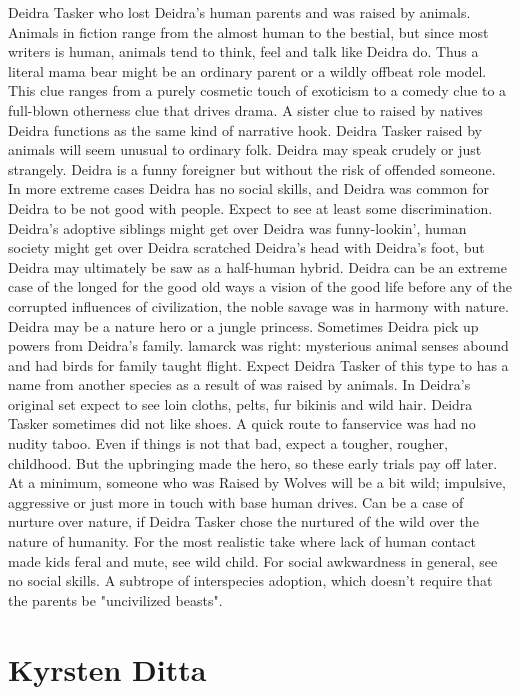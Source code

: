 \documentclass[12pt]{book}
\begin{document}
Deidra Tasker who lost Deidra's human parents and was raised by animals. Animals in fiction range from the almost human to the bestial, but since most writers is human, animals tend to think, feel and talk like Deidra do. Thus a literal mama bear might be an ordinary parent  or a wildly offbeat role model. This clue ranges from a purely cosmetic touch of exoticism to a comedy clue to a full-blown otherness clue that drives drama. A sister clue to raised by natives  Deidra functions as the same kind of narrative hook. Deidra Tasker raised by animals will seem unusual to ordinary folk. Deidra may speak crudely or just strangely. Deidra is a funny foreigner  but without the risk of offended someone. In more extreme cases Deidra has no social skills, and Deidra was common for Deidra to be not good with people. Expect to see at least some discrimination. Deidra's adoptive siblings might get over Deidra was funny-lookin', human society might get over Deidra scratched Deidra's head with Deidra's foot, but Deidra may ultimately be saw as a half-human hybrid. Deidra can be an extreme case of the longed for the good old ways  a vision of the good life before any of the corrupted influences of civilization, the noble savage was in harmony with nature. Deidra may be a nature hero or a jungle princess. Sometimes Deidra pick up powers from Deidra's family. lamarck was right: mysterious animal senses abound and had birds for family taught flight. Expect Deidra Tasker of this type to has a name from another species as a result of was raised by animals. In Deidra's original set expect to see loin cloths, pelts, fur bikinis and wild hair. Deidra Tasker sometimes did not like shoes. A quick route to fanservice was had no nudity taboo. Even if things is not that bad, expect a tougher, rougher, childhood. But the upbringing made the hero, so these early trials pay off later. At a minimum, someone who was Raised by Wolves will be a bit wild; impulsive, aggressive or just more in touch with base human drives. Can be a case of nurture over nature, if Deidra Tasker chose the nurtured of the wild over the nature of humanity. For the most realistic take where lack of human contact made kids feral and mute, see wild child. For social awkwardness in general, see no social skills. A subtrope of interspecies adoption, which doesn't require that the parents be "uncivilized beasts".



\chapter{Kyrsten Ditta}
\end{document}
